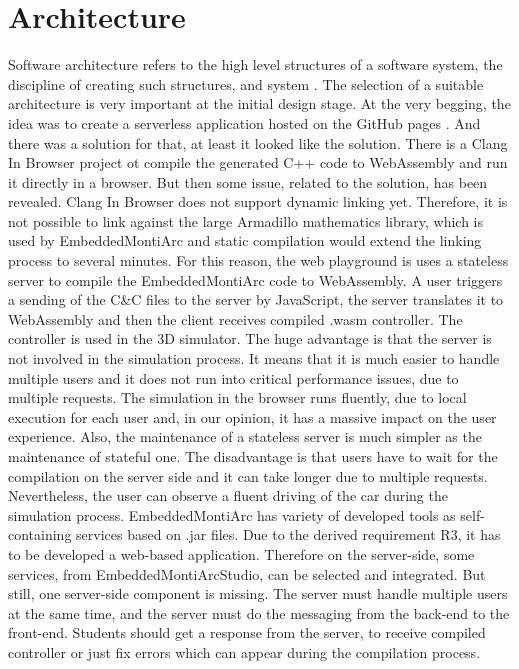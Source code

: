 \section{Architecture}
Software architecture refers to the high level structures of a software system, the discipline of creating such structures, and system \cite{SWArch}. The selection of a suitable architecture is very important at the initial design stage. At the very begging, the idea was to create a serverless application hosted on the GitHub pages \cite{GHPages}. And there was a solution for that, at least it looked like the solution. There is a Clang In Browser \cite{CIB} project ot compile the generated C++ code to WebAssembly and run it directly in a browser. But then some issue, related to the solution, has been revealed. Clang In Browser does not support dynamic linking yet. Therefore, it is not possible to link against the large Armadillo mathematics library, which is used by EmbeddedMontiArc and static compilation would extend the linking process to several minutes. For this reason, the web playground is uses a stateless server to compile the EmbeddedMontiArc code to WebAssembly. A user triggers a sending of the C\&C files to the server by JavaScript, the server translates it to WebAssembly and then the client receives compiled .wasm controller. The controller is used in the 3D simulator. The huge advantage is that the server is not involved in the simulation process. It means that it is much easier to handle multiple users and it does not run into critical performance issues, due to multiple requests. The simulation in the browser runs fluently, due to local execution for each user and, in our opinion, it has a massive impact on the user experience. Also, the maintenance of a stateless server is much simpler as the maintenance of stateful one. The disadvantage is that users have to wait for the compilation on the server side and it can take longer due to multiple requests. Nevertheless, the user can observe a fluent driving of the car during the simulation process.\newline 
EmbeddedMontiArc has variety of developed tools as self-containing services based on .jar files. Due to the derived requirement R3, it has to be developed a web-based application. Therefore on the server-side, some services, from EmbeddedMontiArcStudio, can be selected and integrated. But still, one server-side component is missing. The server must handle multiple users at the same time, and the server must do the messaging from the back-end to the front-end. Students should get a response from the server, to receive compiled controller or just fix errors which can appear during the compilation process.\newline
